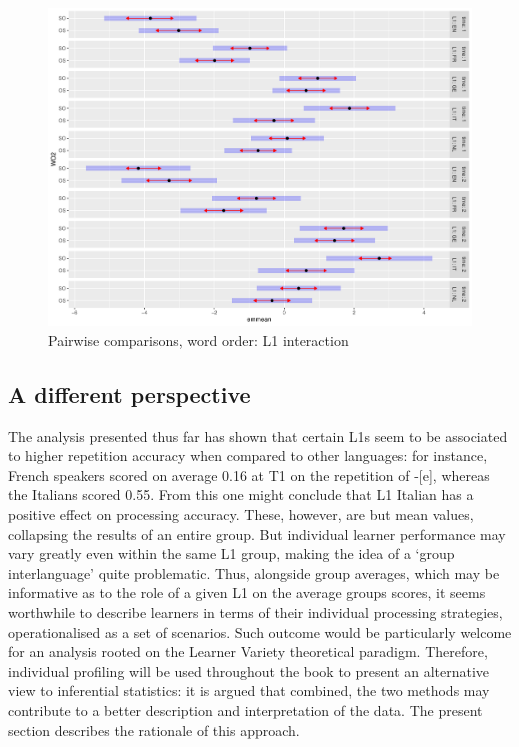 \begin{figure}
    \includegraphics[width=\textwidth]{figures/04-4.pdf}
    \caption{Pairwise comparisons, word order: L1 interaction}
    \label{fig:04:4}
\end{figure}

\subsection{A different perspective}\label{sec:04:2.4}

The analysis presented thus far has shown that certain L1s seem to be associated to higher repetition accuracy when compared to other languages: for instance, French speakers scored on average 0.16 at T1 on the repetition of -[e], whereas the Italians scored 0.55. From this one might conclude that L1 Italian has a positive effect on processing accuracy. These, however, are but mean values, collapsing the results of an entire group. But individual learner performance may vary greatly even within the same L1 group, making the idea of a ‘group interlanguage’ quite problematic. Thus, alongside group averages, which may be informative as to the role of a given L1 on the average groups scores, it seems worthwhile to describe learners in terms of their individual processing strategies, operationalised as a set of scenarios. Such outcome would be particularly welcome for an analysis rooted on the Learner Variety theoretical paradigm. Therefore, individual profiling will be used throughout the book to present an alternative view to inferential statistics: it is argued that combined, the two methods may contribute to a better description and interpretation of the data. The present section describes the rationale of this approach.

